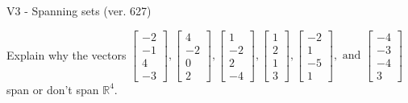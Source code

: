\begin{exercise}
  \begin{exerciseTitle}V3 - Spanning sets (ver. 627)\end{exerciseTitle}
  \begin{exerciseStatement}
    Explain why the vectors \(\left[\begin{array}{r}
-2 \\
-1 \\
4 \\
-3
\end{array}\right] , \left[\begin{array}{r}
4 \\
-2 \\
0 \\
2
\end{array}\right] , \left[\begin{array}{r}
1 \\
-2 \\
2 \\
-4
\end{array}\right] , \left[\begin{array}{r}
1 \\
2 \\
1 \\
3
\end{array}\right] , \left[\begin{array}{r}
-2 \\
1 \\
-5 \\
1
\end{array}\right] , \text{ and } \left[\begin{array}{r}
-4 \\
-3 \\
-4 \\
3
\end{array}\right]\) span or don't span \(\mathbb{R}^4\). 
	



\end{exerciseStatement}
\end{exercise}
